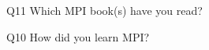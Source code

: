 \begin{description}%
\item{Q11} Which MPI book(s) have you read?%
\item{Q10} How did you learn MPI?%
\end{description}%
